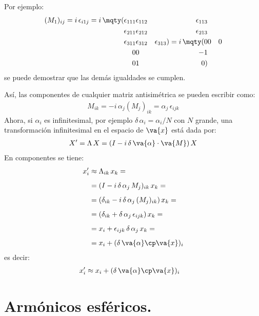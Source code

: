 Por ejemplo:
\begin{align}
(M_{1})_{ij} = i \, \epsilon_{i 1 j} = i \, \mqty(\epsilon_{111} & \epsilon_{112} & \epsilon_{113} \\ \epsilon_{211} & \epsilon_{212} & \epsilon_{213} \\ \epsilon_{311} & \epsilon_{312} & \epsilon_{313}) = i \, \mqty(0 & 0 & 0 \\ 0 & 0 & -1 \\ 0 & 1 & 0)
\label{eq:ecuacion_10_091}
\end{align}
se puede demostrar que las demás igualdades se cumplen.
\par
Así, las componentes de cualquier matriz antisimétrica se pueden escribir como:
\begin{align}
M_{ik} = - i \, \alpha_{j} (M_{j})_{ik} = \alpha_{j} \, \epsilon_{ijk}
\label{eq:ecuacion_10_092}
\end{align}
Ahora, si $\alpha_{i}$ es infinitesimal, por ejemplo $\delta \, \alpha_{i} = \alpha_{i} / N$ con $N$ grande, una transformación infinitesimal en el espacio de $\va{x}$ está dada por:
\begin{align}
X^{\prime} = \Lambda \, X = (I - i \, \delta \, \va{\alpha} \cdot \va{M}) \, X
\label{eq:ecuacion_10_093}
\end{align}
En componentes se tiene:
\begin{align}
\begin{aligned}[b]
x_{i}^{\prime} &\approx \Lambda_{ik} \, x_{k} = \\[0.5em]
&= (I - i \, \delta \, \alpha_{j} \, M_{j})_{ik} \, x_{k} = \\[0.5em]
&= (\delta_{ik} - i \, \delta \, \alpha_{j} \, (M_{j})_{ik}) \, x_{k} = \\[0.5em]
&= (\delta_{ik} + \delta \, \alpha_{j} \, \epsilon_{ijk}) \, x_{k} = \\[0.5em]
&= x_{i} + \epsilon_{ijk} \, \delta \, \alpha_{j} \, x_{k} = \\[0.5em]
&= x_{i} + (\delta \, \va{\alpha} \cp \va{x})_{i}
\end{aligned}
\label{eq:ecuacion_10_094}
\end{align}
es decir:
\begin{align}
x_{i}^{\prime} &\approx x_{i} + (\delta \, \va{\alpha} \cp \va{x})_{i} \label{eq:ecuacion_10_095}
\end{align}

\section{Armónicos esféricos.}

